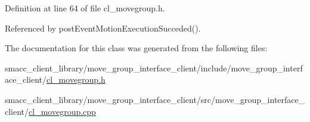 Definition at line 64 of file cl\+\_\+movegroup.\+h.



Referenced by post\+Event\+Motion\+Execution\+Succeded().



The documentation for this class was generated from the following files\+:\begin{DoxyCompactItemize}
\item 
smacc\+\_\+client\+\_\+library/move\+\_\+group\+\_\+interface\+\_\+client/include/move\+\_\+group\+\_\+interface\+\_\+client/\hyperlink{cl__movegroup_8h}{cl\+\_\+movegroup.\+h}\item 
smacc\+\_\+client\+\_\+library/move\+\_\+group\+\_\+interface\+\_\+client/src/move\+\_\+group\+\_\+interface\+\_\+client/\hyperlink{cl__movegroup_8cpp}{cl\+\_\+movegroup.\+cpp}\end{DoxyCompactItemize}
